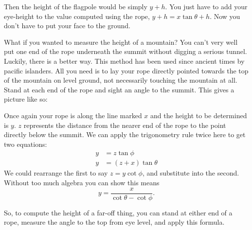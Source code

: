 \documentclass{article}
\begin{document}
Then the height of the flagpole would be simply $y+h$. You just have to add your eye-height to the value computed using the rope, $y+h=x\tan\theta+h$. Now you don't have to put your face to the ground.

What if you wanted to measure the height of a mountain? You can't very well put one end of the rope underneath the summit without digging a serious tunnel. Luckily, there is a better way. This method has been used since ancient times by pacific islanders. All you need is to lay your rope directly pointed towards the top of the mountain on level ground, not necessarily touching the mountain at all. Stand at each end of the rope and sight an angle to the summit. This gives a picture like so:

\begin{figure}[h!]
\centering
{}
\end{figure}

Once again your rope is along the line marked $x$ and the height to be determined is $y$. $z$ represents the distance from the nearer end of the rope to the point directly below the summit. We can apply the trigonometry rule twice here to get two equations:
\begin{align*}
y &= z \tan \phi\\
y &= (z+x) \tan \theta
\end{align*}
We could rearrange the first to say $z = y \cot \phi$, and substitute into the second. Without too much algebra you can show this means
\[
y = \frac{x}{\cot \theta -\cot \phi}.
\]

So, to compute the height of a far-off thing, you can stand at either end of a rope, measure the angle to the top from eye level, and apply this formula.
\end{document}
